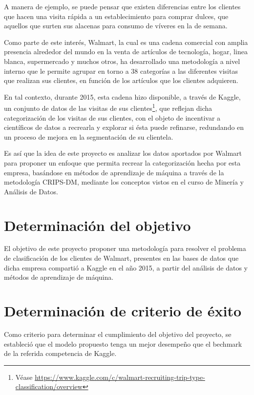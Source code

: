 \documentclass[]{book}
\let\rmarkdownfootnote\footnote%
\def\footnote{\protect\rmarkdownfootnote}
\begin{document}
A manera de ejemplo, se puede pensar que existen diferencias entre los clientes que hacen una visita rápida a un establecimiento para comprar dulces, que aquellos que surten sus alacenas para consumo de víveres en la de semana.

Como parte de este interés, Walmart, la cual es una cadena comercial con amplia presencia alrededor del mundo en la venta de artículos de tecnología, hogar, linea blanca, supermercado y muchos otros, ha desarrollado una metodología a nivel interno que le permite agrupar en torno a 38 categorías a las diferentes visitas que realizan sus clientes, en función de los artículos que los clientes adquieren.

En tal contexto, durante 2015, esta cadena hizo disponible, a través de Kaggle, un conjunto de datos de las visitas de sus clientes\footnote{Véase \url{https://www.kaggle.com/c/walmart-recruiting-trip-type-classification/overview}}, que reflejan dicha categorización de los visitas de sus clientes, con el objeto de incentivar a científicos de datos a recrearla y explorar si ésta puede refinarse, redundando en un proceso de mejora en la segmentación de su clientela.

Es así que la idea de este proyecto es analizar los datos aportados por Walmart para proponer un enfoque que permita recrear la categorización hecha por esta empresa, basándose en métodos de aprendizaje de máquina a través de la metodología CRIPS-DM, mediante los conceptos vistos en el curso de Minería y Análisis de Datos.

\hypertarget{determinaciuxf3n-del-objetivo}{%
\section{Determinación del objetivo}\label{determinaciuxf3n-del-objetivo}}

El objetivo de este proyecto proponer una metodología para resolver el problema de clasificación de los clientes de Walmart, presentes en las bases de datos que dicha empresa compartió a Kaggle en el año 2015, a partir del análisis de datos y métodos de aprendizaje de máquina.

\hypertarget{determinaciuxf3n-de-criterio-de-uxe9xito}{%
\section{Determinación de criterio de éxito}\label{determinaciuxf3n-de-criterio-de-uxe9xito}}

Como criterio para determinar el cumplimiento del objetivo del proyecto, se estableció que el modelo propuesto tenga un mejor desempeño que el bechmark de la referida competencia de Kaggle.
\end{document}
